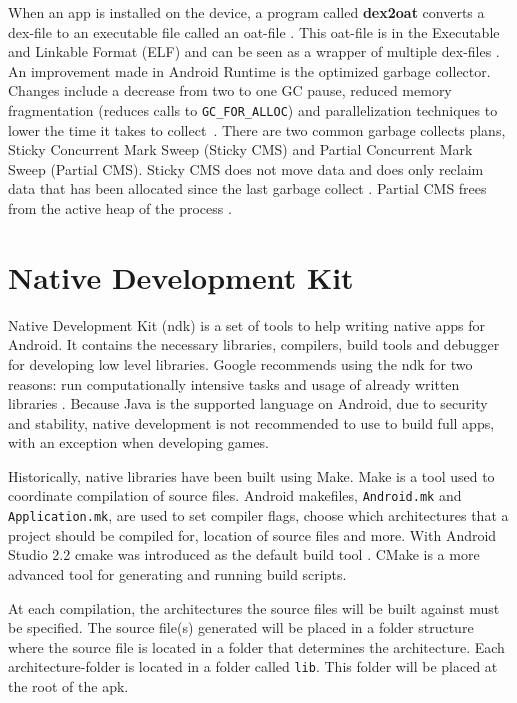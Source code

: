 When an app is installed on the device, a program called \textbf{dex2oat} converts a \gls{dex}-file to an executable file called an oat-file \cite{android:art:dalvik}. This oat-file is in the Executable and Linkable Format (ELF) and can be seen as a wrapper of multiple \gls{dex}-files \cite{Dresel2016}. An improvement made in Android Runtime is the optimized garbage collector. Changes include a decrease from two to one GC pause, reduced memory fragmentation (reduces calls to \texttt{GC\_FOR\_ALLOC}) and parallelization techniques to lower the time it takes to collect~\cite{android:art:dalvik}. There are two common garbage collects plans, Sticky Concurrent Mark Sweep (Sticky CMS) and Partial Concurrent Mark Sweep (Partial CMS). Sticky CMS does not move data and does only reclaim data that has been allocated since the last garbage collect \cite{android:art:gc}. Partial CMS frees from the active heap of the process \cite[p.~122]{sillars2015high}.

\section{Native Development Kit}
Native Development Kit (\gls{ndk}) is a set of tools to help writing native apps for Android. It contains the necessary libraries, compilers, build tools and debugger for developing low level libraries. Google recommends using the \gls{ndk} for two reasons: run computationally intensive tasks and usage of already written libraries \cite{android:ndk:guides}. Because Java is the supported language on Android, due to security and stability, native development is not recommended to use to build full apps, with an exception when developing games.

Historically, native libraries have been built using Make. Make is a tool used to coordinate compilation of source files. Android makefiles, \texttt{Android.mk} and \texttt{Application.mk}, are used to set compiler flags, choose which architectures that a project should be compiled for, location of source files and more. With Android Studio 2.2 \gls{cmake} was introduced as the default build tool \cite{android:studio:cmake}. CMake is a more advanced tool for generating and running build scripts.

At each compilation, the architectures the source files will be built against must be specified. The source file(s) generated will be placed in a folder structure where the source file is located in a folder that determines the architecture. Each architecture-folder is located in a folder called \texttt{lib}. This folder will be placed at the root of the \gls{apk}.

